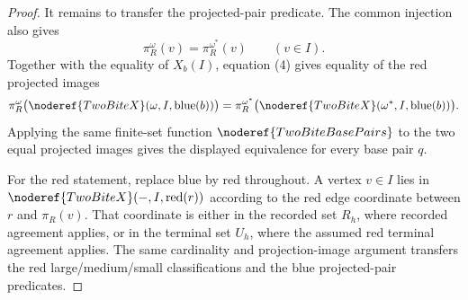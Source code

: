 \begin{proof}
It remains to transfer the projected-pair predicate.  The common injection
also gives
\[
\pi_R^\omega(v)=\pi_R^{\omega^\ast}(v)
\qquad(v\in I).
\tag{4}
\]
Together with the equality of \(X_b(I)\), equation (4) gives equality of the
red projected images
\[
\pi_R^\omega\bigl(\noderef{TwoBiteX}(\omega,I,\operatorname{blue}(b))\bigr)
=
\pi_R^{\omega^\ast}
\bigl(\noderef{TwoBiteX}(\omega^\ast,I,\operatorname{blue}(b))\bigr).
\]
Applying the same finite-set function
\(\noderef{TwoBiteBasePairs}\) to the two equal projected images gives the
displayed equivalence for every base pair \(q\).

For the red statement, replace blue by red throughout.  A vertex
\(v\in I\) lies in
\(\noderef{TwoBiteX}(-,I,\operatorname{red}(r))\) according to the red edge
coordinate between \(r\) and \(\pi_R(v)\).  That coordinate is either in the
recorded set \(R_h\), where recorded agreement applies, or in the terminal
set \(U_h\), where the assumed red terminal agreement applies.  The same
cardinality and projection-image argument transfers the red
large/medium/small classifications and the blue projected-pair predicates.
\end{proof}
